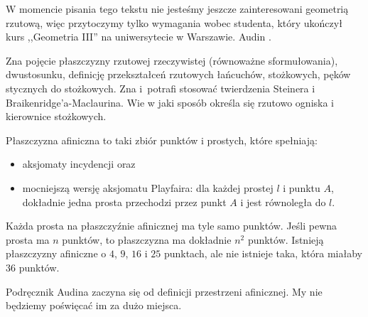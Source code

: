 W momencie pisania tego tekstu nie jesteśmy jeszcze zainteresowani geometrią rzutową, więc przytoczymy tylko wymagania wobec studenta, który ukończył kurs ,,Geometria III'' na uniwersytecie w Warszawie.
Audin \cite[s. 143-182]{audin_2003}.


Zna pojęcie płaszczyzny rzutowej rzeczywistej (równoważne sformułowania), dwustosunku, definicję przekształceń rzutowych łańcuchów, stożkowych, pęków stycznych do stożkowych.
%
%
%
Zna i~potrafi stosować twierdzenia Steinera i Braikenridge'a-Maclaurina.
%
%
Wie w jaki sposób określa się rzutowo ogniska i kierownice stożkowych.
%
%

\begin{proposition}
    Płaszczyzna afiniczna to taki zbiór punktów i prostych, które spełniają:
    \begin{itemize}
        \item aksjomaty incydencji oraz
        \item mocniejszą wersję aksjomatu Playfaira: dla każdej prostej $l$ i punktu $A$, dokładnie jedna prosta przechodzi przez punkt $A$ i jest równoległa do $l$.
    \end{itemize}
    Każda prosta na płaszczyźnie afinicznej ma tyle samo punktów.
    Jeśli pewna prosta ma $n$ punktów, to płaszczyzna ma dokładnie $n^2$ punktów.
    Istnieją płaszczyzny afiniczne o $4$, $9$, $16$ i $25$ punktach, ale nie istnieje taka, która miałaby $36$ punktów.
\end{proposition} %

Podręcznik Audina \cite[s. 7]{audin_2003} zaczyna się od definicji przestrzeni afinicznej.
My nie będziemy poświęcać im za dużo miejsca.

%